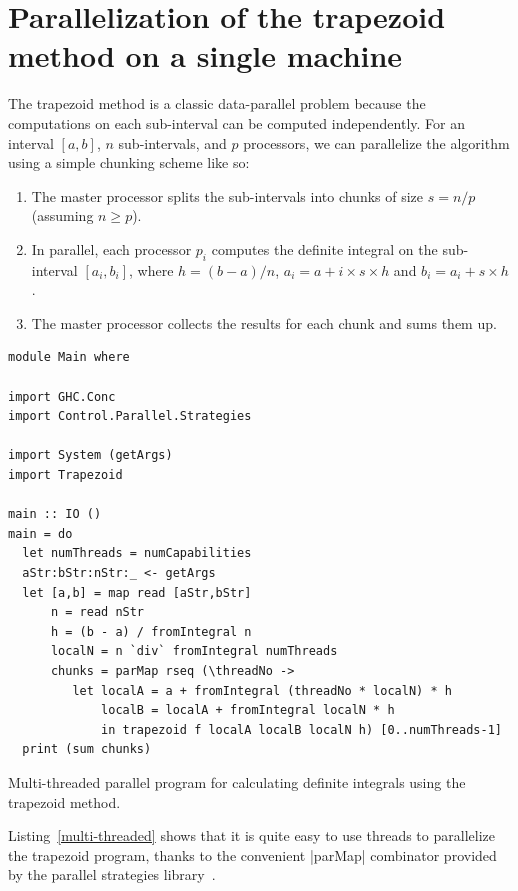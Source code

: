 \documentclass{tmr}
\begin{document}
\section{Parallelization of the trapezoid method on a single machine}

The trapezoid method is a classic data-parallel problem because
the computations on each sub-interval can be computed independently.
For an interval $[a,b]$, $n$ sub-intervals, and $p$ processors, we can parallelize
the algorithm using a simple chunking scheme like so:
\begin{enumerate}
   \item The master processor splits the sub-intervals into chunks of size $s = n/p$ (assuming $n \ge p$).
   \item In parallel, each processor $p_i$ computes the definite integral on the sub-interval 
         $[a_i, b_i]$, where $h = (b - a)/n$, $a_i = a + i \times s \times h$ and
         $b_i = a_i + s \times h$.
   \item The master processor collects the results for each chunk and sums them up.
\end{enumerate}

\begin{listing}
\begin{Verbatim}
module Main where

import GHC.Conc
import Control.Parallel.Strategies

import System (getArgs)
import Trapezoid

main :: IO ()
main = do
  let numThreads = numCapabilities
  aStr:bStr:nStr:_ <- getArgs
  let [a,b] = map read [aStr,bStr]
      n = read nStr
      h = (b - a) / fromIntegral n
      localN = n `div` fromIntegral numThreads
      chunks = parMap rseq (\threadNo ->
         let localA = a + fromIntegral (threadNo * localN) * h
             localB = localA + fromIntegral localN * h
             in trapezoid f localA localB localN h) [0..numThreads-1]
  print (sum chunks)
\end{Verbatim}
\caption{Multi-threaded parallel program for calculating definite integrals using the trapezoid method. \label{multi-threaded}}
\end{listing}

Listing~\ref{multi-threaded} shows that it is quite easy to use threads to
parallelize the trapezoid program, thanks to the convenient |parMap| combinator provided by the
parallel strategies library~\cite{parallel_library}.
\end{document}
